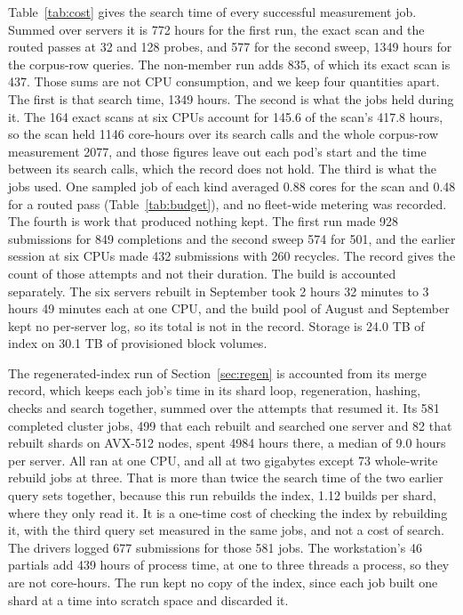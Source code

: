 \documentclass[sigconf, nonacm]{acmart}
\begin{document}
Table~\ref{tab:cost} gives the search time of every successful measurement job. Summed over
servers it is 772 hours for the first run, the exact scan and the routed passes at 32 and 128
probes, and 577 for the second sweep, 1349 hours for the corpus-row queries. The non-member run
adds 835, of which its exact scan is 437. Those sums are not CPU consumption, and we keep four
quantities apart. The first is that search time, 1349 hours. The second is what the jobs held
during it. The 164 exact scans at six CPUs account for 145.6 of the scan's 417.8 hours, so the
scan held 1146 core-hours over its search calls and the whole corpus-row measurement 2077, and
those figures leave out each pod's start and the time between its search calls, which the record
does not hold. The third is what the jobs used. One sampled job of each kind averaged 0.88 cores
for the scan and 0.48 for a routed pass (Table~\ref{tab:budget}), and no fleet-wide metering was
recorded. The fourth is work that produced nothing kept. The first run made 928 submissions for
849 completions and the second sweep 574 for 501, and the earlier session at six CPUs made 432
submissions with 260 recycles. The record gives the count of those attempts and not their
duration. The build is accounted separately. The six servers rebuilt in September took 2 hours 32
minutes to 3 hours 49 minutes each at one CPU, and the build pool of August and September kept no
per-server log, so its total is not in the record. Storage is 24.0 TB of index on 30.1 TB of
provisioned block volumes.

The regenerated-index run of Section~\ref{sec:regen} is accounted from its merge record, which
keeps each job's time in its shard loop, regeneration, hashing, checks and search together,
summed over the attempts that resumed it. Its 581 completed cluster jobs, 499 that each rebuilt
and searched one server and 82 that rebuilt shards on AVX-512 nodes, spent 4984 hours there, a
median of 9.0 hours per server. All ran at one CPU, and all at two gigabytes except 73
whole-write rebuild jobs at three. That is more than twice the search time of the two earlier
query sets together, because this run rebuilds the index, 1.12 builds per shard, where they
only read it. It is a one-time cost of checking the index by rebuilding it, with the third query
set measured in the same jobs, and not a cost of search. The drivers logged 677 submissions for those 581 jobs. The workstation's 46
partials add 439 hours of process time, at one to three threads a process, so they are not
core-hours. The run kept no copy of the index, since each job built one shard at a time into
scratch space and discarded it.
\end{document}
